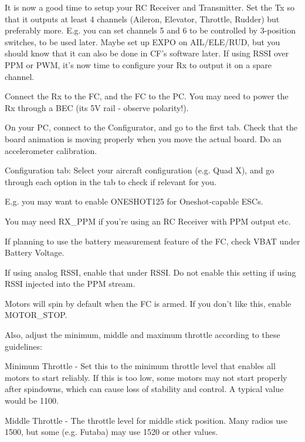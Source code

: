 \begin{DoxyItemize}
\item It is now a good time to setup your R\+C Receiver and Transmitter. Set the Tx so that it outputs at least 4 channels (Aileron, Elevator, Throttle, Rudder) but preferably more. E.\+g. you can set channels 5 and 6 to be controlled by 3-\/position switches, to be used later. Maybe set up E\+X\+P\+O on A\+I\+L/\+E\+L\+E/\+R\+U\+D, but you should know that it can also be done in C\+F's software later. If using R\+S\+S\+I over P\+P\+M or P\+W\+M, it's now time to configure your Rx to output it on a spare channel.
\item Connect the Rx to the F\+C, and the F\+C to the P\+C. You may need to power the Rx through a B\+E\+C (its 5\+V rail -\/ observe polarity!).
\item On your P\+C, connect to the Configurator, and go to the first tab. Check that the board animation is moving properly when you move the actual board. Do an accelerometer calibration.
\item Configuration tab\+: Select your aircraft configuration (e.\+g. Quad X), and go through each option in the tab to check if relevant for you.
\begin{DoxyItemize}
\item E.\+g. you may want to enable O\+N\+E\+S\+H\+O\+T125 for Oneshot-\/capable E\+S\+Cs.
\item You may need R\+X\+\_\+\+P\+P\+M if you're using an R\+C Receiver with P\+P\+M output etc.
\item If planning to use the battery measurement feature of the F\+C, check V\+B\+A\+T under Battery Voltage.
\item If using analog R\+S\+S\+I, enable that under R\+S\+S\+I. Do not enable this setting if using R\+S\+S\+I injected into the P\+P\+M stream.
\item Motors will spin by default when the F\+C is armed. If you don't like this, enable M\+O\+T\+O\+R\+\_\+\+S\+T\+O\+P.
\item Also, adjust the minimum, middle and maximum throttle according to these guidelines\+:
\begin{DoxyItemize}
\item Minimum Throttle -\/ Set this to the minimum throttle level that enables all motors to start reliably. If this is too low, some motors may not start properly after spindowns, which can cause loss of stability and control. A typical value would be 1100.
\item Middle Throttle -\/ The throttle level for middle stick position. Many radios use 1500, but some (e.\+g. Futaba) may use 1520 or other values.

\end{DoxyItemize}
\end{DoxyItemize}
\end{DoxyItemize}
